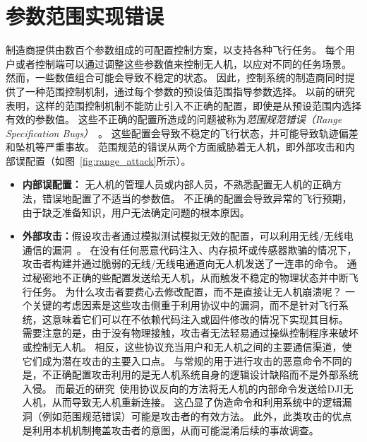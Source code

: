 \section{参数范围实现错误}
制造商提供由数百个参数组成的可配置控制方案，以支持各种飞行任务。
每个用户或者控制端可以通过调整这些参数值来控制无人机，以应对不同的任务场景。
然而，一些数值组合可能会导致不稳定的状态。
因此，控制系统的制造商同时提供了一种范围控制机制，通过每个参数的预设值范围指导参数选择。
以前的研究表明，这样的范围控制机制不能防止引入不正确的配置，即使是从预设范围内选择有效的参数值。
这些不正确的配置所造成的问题被称为\textit{范围规范错误（Range Specification Bugs）}~\cite{rvfuzzer, han2022control}。
这些配置会导致不稳定的飞行状态，并可能导致轨迹偏差和坠机等严重事故。
范围规范的错误从两个方面威胁着无人机，即外部攻击和内部误配置（如图~\ref{fig:range_attack}所示）。
\begin{itemize}

 \item \textbf{内部误配置：}
无人机的管理人员或内部人员，不熟悉配置无人机的正确方法，错误地配置了不适当的参数值。
不正确的配置会导致异常的飞行预期，由于缺乏准备知识，用户无法确定问题的根本原因。

\item \textbf{外部攻击：}假设攻击者通过模拟测试模拟无效的配置，可以利用无线/无线电通信的漏洞~\cite{kwon2018empirical,rodday2016exploring, vanhoef2017key}。
在没有任何恶意代码注入、内存损坏或传感器欺骗的情况下，攻击者构建并通过脆弱的无线/无线电通道向无人机发送了一连串的命令。
通过秘密地不正确的些配置发送给无人机，从而触发不稳定的物理状态并中断飞行任务。
为什么攻击者要费心去修改配置，而不是直接让无人机崩溃呢？
一个关键的考虑因素是这些攻击侧重于利用协议中的漏洞，而不是针对飞行系统，这意味着它们可以在不依赖代码注入或固件修改的情况下实现其目标。
需要注意的是，由于没有物理接触，攻击者无法轻易通过操纵控制程序来破坏或控制无人机。 
相反，这些协议充当用户和无人机之间的主要通信渠道，使它们成为潜在攻击的主要入口点。
与常规的用于进行攻击的恶意命令不同的是，不正确配置攻击利用的是无人机系统自身的逻辑设计缺陷而不是外部系统入侵。
而最近的研究~\cite{schiller2023drone}使用协议反向的方法将无人机的内部命令发送给DJI无人机，从而导致无人机重新连接。
这凸显了伪造命令和利用系统中的逻辑漏洞（例如范围规范错误）可能是攻击者的有效方法。 此外，此类攻击的优点是利用本机机制掩盖攻击者的意图，从而可能混淆后续的事故调查。



\end{itemize}

